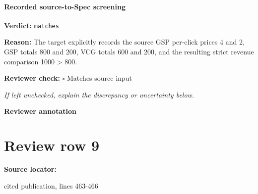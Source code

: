 \documentclass[10pt]{article}
\newcommand{\reviewerbox}{%
  \par\noindent\fbox{\parbox{0.96\linewidth}{\rule{0pt}{0.38in}}}\par
}
\newcommand{\reviewmatch}[1]{%
  \par\noindent\textbf{Reviewer check:} $\square$\; #1\par
  \noindent\emph{If left unchecked, explain the discrepancy or uncertainty below.}\par
}
\begin{document}
\paragraph{Recorded source-to-Spec screening}
\textbf{Verdict:} \texttt{matches}
\\
{\raggedright
\textbf{Reason:} The target explicitly records the source GSP per-\allowbreak{}click prices 4 and 2, GSP totals 800 and 200, VCG totals 600 and 200, and the resulting strict revenue comparison 1000 > 800.\allowbreak{}
\par}
\reviewmatch{Matches source input}
\noindent\textbf{Reviewer annotation}\par
\reviewerbox
\clearpage
\hypertarget{source-claim-a50c255540689cf3}{}
\section*{Review row 9}
\textbf{Source locator:} {\footnotesize\raggedright cited publication, lines 463-\allowbreak{}466\par}
\end{document}
